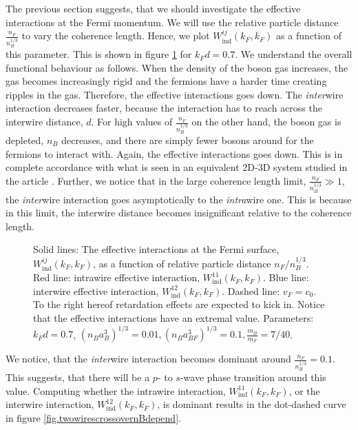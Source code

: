 The previous section suggests, that we should investigate the effective interactions at the Fermi momentum. We will use the relative particle distance $\frac{n_F}{n_B^{1/3}}$ to vary the coherence length. Hence, we plot $W^{ij}_{\text{ind}}(k_F,k_F)$ as a function of this parameter. This is shown in figure \ref{fig.EffectiveInteraction.nBdepend} for $k_Fd = 0.7$. We understand the overall functional behaviour as follows. When the density of the boson gas increases, the gas becomes increasingly rigid and the fermions have a harder time creating ripples in the gas. Therefore, the effective interactions goes down. The \textit{inter}wire interaction decreases faster, because the interaction has to reach across the interwire distance, $d$. For high values of $\frac{n_F}{n_B^{1/3}}$ on the other hand, the boson gas is depleted, $n_B$ decreases, and there are simply fewer bosons around for the fermions to interact with. Again, the effective interactions goes down. This is in complete accordance with what is seen in an equivalent 2D-3D system studied in the article \cite{BruunZhigangTopSuperfluid}. Further, we notice that in the large coherence length limit, $\frac{n_F}{n_B^{1/3}} \gg 1$, the \textit{inter}wire interaction goes asymptotically to the \textit{intra}wire one. This is because in this limit, the interwire distance becomes insignificant relative to the coherence length. 

\begin{figure} 
\begin{center}  
  
\caption{Solid lines: The effective interactions at the Fermi surface, $W^{ij}_{\text{ind}}(k_F,k_F)$, as a function of relative particle distance $n_F/n_B^{1/3}$. Red line: intrawire effective interaction, $W^{11}_{\text{ind}}(k_F,k_F)$. Blue line: interwire effective interaction, $W^{12}_{\text{ind}}(k_F,k_F)$. Dashed line: $v_F = c_0$. To the right hereof retardation effects are expected to kick in. Notice that the effective interactions have an extremal value. Parameters: $k_Fd = 0.7$, $(n_Ba_B^3)^{1/3} = 0.01, (n_Ba_{BF}^3)^{1/3} = 0.1, \frac{m_B}{m_F} = 7/40$.}  
\label{fig.EffectiveInteraction.nBdepend}  
\end{center}    
\end{figure}

We notice, that the \textit{inter}wire interaction becomes dominant around $\frac{n_F}{n_B^{1/3}} = 0.1$. This suggests, that there will be a $p$- to $s$-wave phase transition around this value. Computing whether the intrawire interaction, $W^{11}_{\text{ind}}(k_F,k_F)$, or the interwire interaction, $W^{12}_{\text{ind}}(k_F,k_F)$, is dominant results in the dot-dashed curve in figure \ref{fig.twowirescrossovernBdepend}. 

